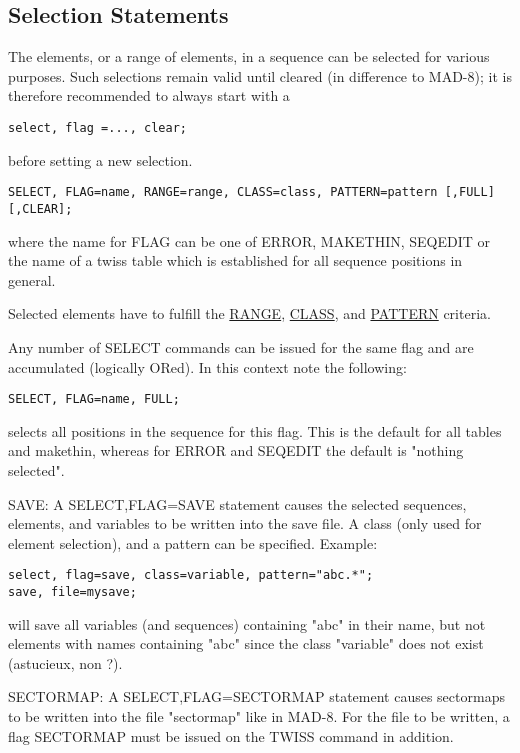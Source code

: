 
\subsection{Selection Statements}

The elements, or a range of elements, in a sequence can be selected for
various purposes. Such selections remain valid until cleared (in
difference to MAD-8); it is therefore recommended to always start with a  

\begin{verbatim}
select, flag =..., clear;
\end{verbatim} 
before setting a new selection. 
\begin{verbatim}
SELECT, FLAG=name, RANGE=range, CLASS=class, PATTERN=pattern [,FULL] [,CLEAR];
\end{verbatim} 
where the name for FLAG can be one of ERROR, MAKETHIN, SEQEDIT or the
name of a twiss table which is established for all sequence positions in
general.  

Selected elements have to fulfill the \href{ranges.html#range}{RANGE},
\href{ranges.html#class}{CLASS}, and \href{wildcard.html}{PATTERN}
criteria.  

Any number of SELECT commands can be issued for the same flag and are
accumulated (logically ORed). In this context note the following:  

\begin{verbatim}
SELECT, FLAG=name, FULL;
\end{verbatim} 
selects all positions in the sequence for this flag. This is the default
for all tables and makethin, whereas for ERROR and SEQEDIT the default
is "nothing selected".  

\href{save_select}{}SAVE: A SELECT,FLAG=SAVE statement causes the
selected sequences, elements, and variables to be written into the save
file. A class (only used for element selection), and a pattern can be
specified. Example:  
\begin{verbatim}
select, flag=save, class=variable, pattern="abc.*";
save, file=mysave;
\end{verbatim} 
will save all variables (and sequences) containing "abc" in their name,
but not elements with names containing "abc" since the class "variable"
does not exist (astucieux, non ?).  

SECTORMAP: A SELECT,FLAG=SECTORMAP statement causes sectormaps to be
written into the file "sectormap" like in MAD-8. For the file to be
written, a flag SECTORMAP must be issued on the TWISS command in
addition.  

